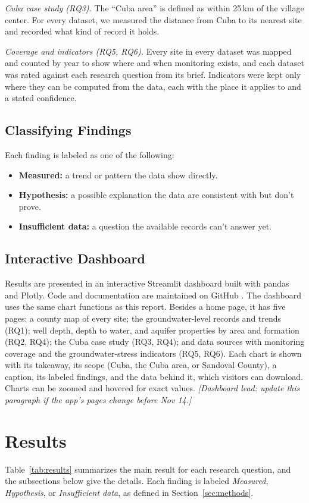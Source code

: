 \documentclass[10pt,twocolumn,letterpaper]{article}
\newif\ifdraftnotes \draftnotestrue   %
\newcommand{\draftnote}[1]{\ifdraftnotes{\color{draftorange}\itshape[#1]}\fi}
\begin{document}
\emph{Cuba case study (RQ3).} The ``Cuba area'' is defined as within 25\,km of the village center.
For every dataset, we measured the distance from Cuba to its nearest site and recorded what kind of
record it holds.

\emph{Coverage and indicators (RQ5, RQ6).} Every site in every dataset was mapped and counted by
year to show where and when monitoring exists, and each dataset was rated against each research
question from its brief. Indicators were kept only where they can be computed from the data, each
with the place it applies to and a stated confidence.

\subsection{Classifying Findings}
Each finding is labeled as one of the following:
\begin{itemize}
  \item \textbf{Measured:} a trend or pattern the data show directly.
  \item \textbf{Hypothesis:} a possible explanation the data are consistent with but don't prove.
  \item \textbf{Insufficient data:} a question the available records can't answer yet.
\end{itemize}

\subsection{Interactive Dashboard}
Results are presented in an interactive Streamlit dashboard built with pandas and Plotly. Code
and documentation are maintained on GitHub \citep{team23_repo}. The dashboard uses the same chart
functions as this report. Besides a home page, it has five pages: a county map of every site; the
groundwater-level records and trends (RQ1); well depth, depth to water, and aquifer properties by
area and formation (RQ2, RQ4); the Cuba case study (RQ3, RQ4); and data sources with monitoring
coverage and the groundwater-stress indicators (RQ5, RQ6). Each chart is shown with its takeaway,
its scope (Cuba, the Cuba area, or Sandoval County), a caption, its labeled findings, and the data
behind it, which visitors can download. Charts can be zoomed and hovered for exact values.
\draftnote{Dashboard lead: update this paragraph if the app's pages change before Nov 14.}

\section{Results}\label{sec:results}
Table~\ref{tab:results} summarizes the main result for each research question, and the subsections
below give the details. Each finding is labeled \emph{Measured}, \emph{Hypothesis}, or
\emph{Insufficient data}, as defined in Section~\ref{sec:methods}.
\end{document}
